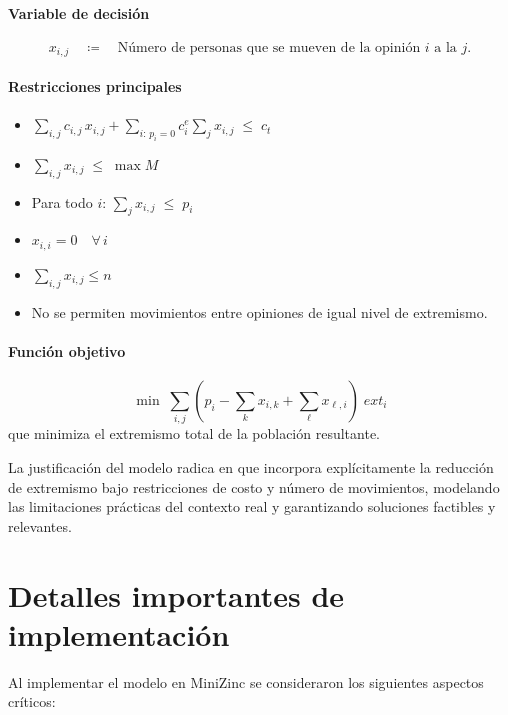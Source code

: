 \documentclass[11pt,letter]{article}
\begin{document}
\paragraph{Variable de decisión}
\[
  x_{i,j} \quad\coloneqq\quad \text{Número de personas que se mueven de la opinión }i\text{ a la }j.
\]

\paragraph{Restricciones principales}
\begin{itemize}
  \item $\displaystyle \sum_{i,j} c_{i,j}\,x_{i,j} + \sum_{i:\,p_i=0} c^e_i \sum_j x_{i,j} \;\le\; c_t$
  \item $\displaystyle \sum_{i,j} x_{i,j} \;\le\; \max M$
  \item Para todo $i$: $\displaystyle \sum_j x_{i,j} \;\le\; p_i$
  \item $x_{i,i} = 0\quad\forall\,i$
  \item $\displaystyle \sum_{i,j} x_{i,j} \le n$
  \item No se permiten movimientos entre opiniones de igual nivel de extremismo.
\end{itemize}

\paragraph{Función objetivo}
\[
  \min\;\sum_{i,j} (p_i - \sum_{k} x_{i,k} + \sum_{\ell} x_{\ell,i})\;\mathit{ext}_i
\]
que minimiza el extremismo total de la población resultante.

\medskip

La justificación del modelo radica en que incorpora explícitamente la reducción de extremismo bajo restricciones de costo y número de movimientos, modelando las limitaciones prácticas del contexto real y garantizando soluciones factibles y relevantes.

\section{Detalles importantes de implementación}

Al implementar el modelo en MiniZinc se consideraron los siguientes aspectos críticos:
\end{document}
